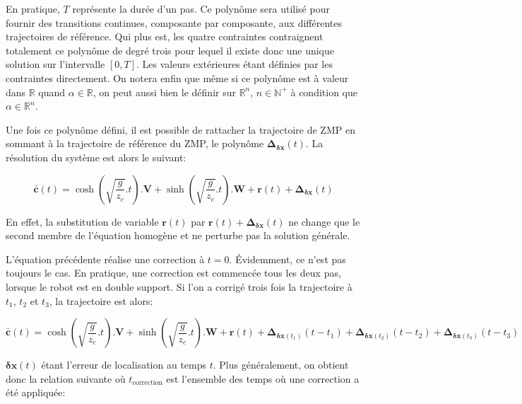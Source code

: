 En pratique, $T$ représente la durée d'un pas. Ce polynôme sera
utilisé pour fournir des transitions continues, composante par
composante, aux différentes trajectoires de référence. Qui plus est,
les quatre contraintes contraignent totalement ce polynôme de degré
trois pour lequel il existe donc une unique solution sur l'intervalle
$[0,T]$. Les valeurs extérieures étant définies par les contraintes
directement. On notera enfin que même si ce polynôme est à valeur dans
$\mathbb{R}$ quand $\alpha \in \mathbb{R}$, on peut aussi bien le
définir sur $\mathbb{R}^n$, $n \in \mathbb{N}^+$ à condition que
$\alpha \in \mathbb{R}^n$.


Une fois ce polynôme défini, il est possible de rattacher la
trajectoire de ZMP en sommant à la trajectoire de référence du ZMP, le
polynôme $\mathbf{\Delta}_{\mathbf{\delta {x}}}(t)$. La résolution du
système est alors le suivant:

\begin{equation} \label{eq:zmpsolcor}
  \bar{\mathbf{c}}(t) = \cosh(\sqrt{\frac{g}{z_c}}.t) . \mathbf{V} +
  \sinh(\sqrt{\frac{g}{z_c}}.t) . \mathbf{W} + \mathbf{r}(t) + \mathbf{\Delta}_{\mathbf{\delta {x}}}(t)
\end{equation}

En effet, la substitution de variable $\mathbf{r}(t)$ par
$\mathbf{r}(t) + \mathbf{\Delta}_{\mathbf{\delta {x}}}(t)$ ne change
que le second membre de l'équation homogène et ne perturbe pas la
solution générale.

L'équation précédente réalise une correction à $t=0$. Évidemment, ce
n'est pas toujours le cas. En pratique, une correction est commencée
tous les deux pas, lorsque le robot est en double support. Si l'on a
corrigé trois fois la trajectoire à $t_1$, $t_2$ et $t_3$, la
trajectoire est alors:

\begin{equation} \label{eq:zmpsolcor2}
  \bar{\mathbf{c}}(t) = \cosh(\sqrt{\frac{g}{z_c}}.t) . \mathbf{V} +
  \sinh(\sqrt{\frac{g}{z_c}}.t) . \mathbf{W} + \mathbf{r}(t) +
  \mathbf{\Delta}_{\mathbf{\delta {x}}(t_1)}(t-t_1) +
  \mathbf{\Delta}_{\mathbf{\delta {x}}(t_2)}(t-t_2) +
  \mathbf{\Delta}_{\mathbf{\delta {x}}(t_3)}(t-t_3)
\end{equation}

$\mathbf{\delta {x}}(t)$ étant l'erreur de localisation au temps
$t$. Plus généralement, on obtient donc la relation suivante où
$t_{\text{correction}}$ est l'ensemble des temps où une correction a
été appliquée:

